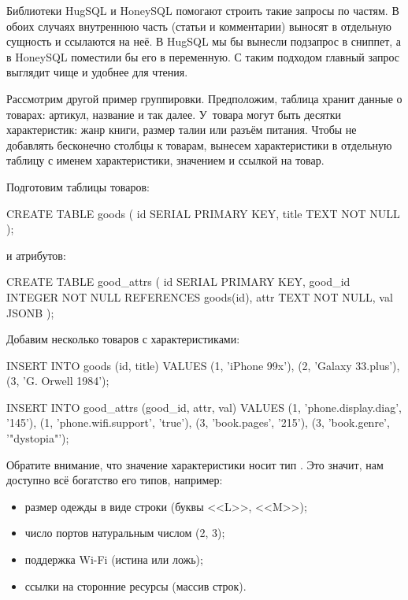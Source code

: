 Библиотеки HugSQL и HoneySQL помогают строить такие запросы по частям. В обоих случаях внутреннюю часть (статьи и комментарии) выносят в отдельную сущность и ссылаются на неё. В HugSQL мы бы вынесли подзапрос в сниппет, а в HoneySQL поместили бы его в переменную. С таким подходом главный запрос выглядит чище и удобнее для чтения.

Рассмотрим другой пример группировки. Предположим, таблица хранит данные о товарах: артикул, название и так далее. У~товара могут быть десятки характеристик: жанр книги, размер талии или разъём питания. Чтобы не добавлять бесконечно столбцы к товарам, вынесем характеристики в отдельную таблицу с именем характеристики, значением и ссылкой на товар.

Подготовим таблицы товаров:

\begin{english}
  \begin{sql}
CREATE TABLE goods (
  id SERIAL PRIMARY KEY,
  title TEXT NOT NULL
);
  \end{sql}
\end{english}

\noindent
и атрибутов:

\begin{english}
  \begin{sql}
CREATE TABLE good_attrs (
  id SERIAL PRIMARY KEY,
  good_id INTEGER NOT NULL REFERENCES goods(id),
  attr TEXT NOT NULL,
  val JSONB
);
  \end{sql}
\end{english}

Добавим несколько товаров с характеристиками:

\begin{english}
  \begin{sql}
INSERT INTO goods (id, title)
VALUES
  (1, 'iPhone 99x'),
  (2, 'Galaxy 33.plus'),
  (3, 'G. Orwell 1984');

INSERT INTO good_attrs (good_id, attr, val)
VALUES
  (1, 'phone.display.diag', '145'),
  (1, 'phone.wifi.support', 'true'),
  (3, 'book.pages', '215'),
  (3, 'book.genre', '"dystopia"');
  \end{sql}
\end{english}


Обратите внимание, что значение характеристики носит тип . Это значит, нам доступно всё богатство его типов, например:

\begin{itemize}

\item
  размер одежды в виде строки (буквы <<L>>, <<M>>);

\item
  число портов натуральным числом (2, 3);

\item
  поддержка Wi-Fi (истина или ложь);

\item
  ссылки на сторонние ресурсы (массив строк).

\end{itemize}

